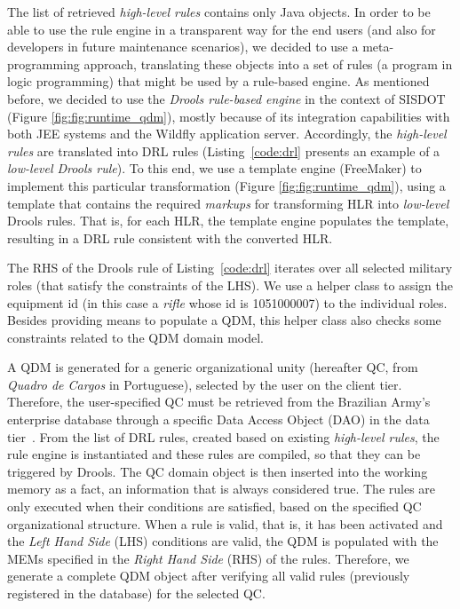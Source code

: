 \documentclass{bmcart}
\newcommand{\callers}{\emph{high-level rules}\xspace}
\newcommand{\shc}{HLR\xspace}
\begin{document}
The list of retrieved \callers contains only Java objects. In order to be able to use the rule engine in a transparent way for the end users (and also for developers in future maintenance scenarios), we decided to use a meta-programming approach, translating these objects into a set of rules (a program in logic programming) that might be used by a rule-based engine. As mentioned before, we decided to use the \emph{Drools rule-based engine} in the context of SISDOT (Figure \ref{fig:fig:runtime_qdm}), mostly because of its integration capabilities with both JEE systems and the Wildfly application server. Accordingly, the \callers are translated into DRL rules (Listing~\ref{code:drl} presents an example of a \emph{low-level Drools rule}). To this end, we use a template engine (FreeMaker) to implement this particular transformation (Figure \ref{fig:fig:runtime_qdm}), using a template that contains the required \emph{markups} for transforming \shc into \emph{low-level} Drools rules. That is, for each \shc, the template engine populates the template, resulting in a DRL rule consistent with the converted \shc.

The RHS of the Drools rule of Listing~\ref{code:drl} iterates over all selected military roles (that satisfy the constraints of the LHS). We use a helper class to assign the equipment id (in this case a \emph{rifle} whose id is 1051000007) to the individual roles. Besides providing means to populate a QDM, this helper class also checks some constraints related to the QDM domain model. 


A QDM is generated for a generic organizational unity (hereafter QC, from \emph{Quadro de Cargos} in Portuguese), selected by the user on the client tier. Therefore, the user-specified QC must be retrieved from the Brazilian Army's enterprise database through a specific Data Access Object (DAO) in the data tier~\cite{alur2003}. From the list of DRL rules, created based on existing \callers, the rule engine is instantiated and these rules are compiled, so that they can be triggered by Drools. The QC domain object is then inserted into the working memory as a fact, an information that is always considered true. The rules are only executed when their conditions are satisfied, based on the specified QC organizational structure. When a rule is valid, that is, it has been activated 
and the \emph{Left Hand Side} (LHS) conditions are valid, the QDM is populated with the MEMs specified in the \emph{Right Hand Side} (RHS) of the rules. Therefore, we generate a complete QDM object after verifying all valid rules (previously registered in the database) for the selected QC. 
\end{document}

